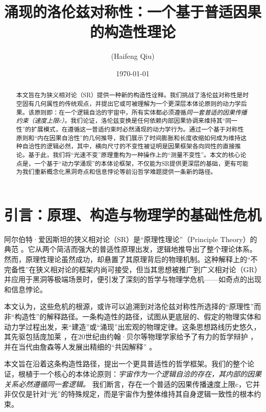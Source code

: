 \documentclass[12pt, a4paper]{article}
\title{\textbf{涌现的洛伦兹对称性：一个基于普适因果的构造性理论}}
\author{(Haifeng Qiu)}
\date{\today}
\begin{document}
\maketitle

\begin{abstract}
\noindent 本文旨在为狭义相对论（SR）提供一种新的构造性诠释。我们挑战了洛伦兹对称性是时空固有几何属性的传统观点，并提出它或可被理解为一个更深层本体论原则的动力学后果。该原则即：在一个逻辑自洽的宇宙中，所有实体都必须遵循\textit{同一套普适的因果传播约束（速度上限c）}。我们论证，洛伦兹变换是任何依赖内部因果协调来维持其``同一性''的扩展模式，在遵循这一普适约束时必然涌现的动力学行为。通过一个基于对称性原则和``内在因果自洽性''的几何推导，我们展示了时间膨胀和长度收缩如何成为维持这种自洽性的逻辑必然，其中，横向尺寸的不变性被证明是因果框架各向同性的直接推论。基于此，我们将``光速不变''原理重构为一种操作上的``测量不变性''。本文的核心论点是，一个基于``动力学涌现''的本体论框架，不仅能为SR提供更深层的基础，更有可能为我们重新概念化黑洞奇点和信息悖论等前沿哲学难题提供一条新的路径。
\end{abstract}

\section{引言：原理、构造与物理学的基础性危机}

阿尔伯特·爱因斯坦的狭义相对论（SR）是``原理性理论''（Principle Theory）的典范 \cite{Einstein1905, Brown2005}。它从两个简洁而强大的普适性原理出发，逻辑地推导出了整个理论体系。然而，原理性理论虽然成功，却悬置了其原理背后的物理机制。这种解释上的``不完备性''在狭义相对论的框架内尚可接受，但当其思想被推广到广义相对论（GR）并应用于黑洞等极端场景时，便引发了深刻的哲学与物理学危机——如奇点的出现和信息悖论。

本文认为，这些危机的根源，或许可以追溯到对洛伦兹对称性所选择的``原理性''而非``构造性''的解释路径。一条构造性的路径，试图从更底层的、假定的物理实体和动力学过程出发，来``建造''或``涌现''出宏观的物理定律。这条思想路线历史悠久，其先驱包括庞加莱 \cite{Poincare1905}，在20世纪由约翰·贝尔等物理学家给予了有力的哲学辩护 \cite{Bell1976}，并在当代由詹森等人发展出精细的``共因解释'' \cite{Janssen2002}。

本文旨在沿着这条构造性路径，提出一个更具普适性的哲学框架。我们的整个论证，根植于一个核心的本体论原则：\textit{宇宙作为一个逻辑自洽的存在，其内部的因果关系必然遵循同一套逻辑。} 我们断言，存在一个普适的因果传播速度上限c，它并非仅仅是针对``光''的特殊规定，而是宇宙作为整体维持其自身逻辑一致性的根本约束。
\end{document}
